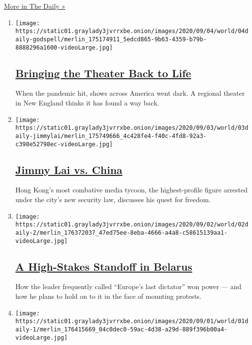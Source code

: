 \href{/column/the-daily}{More in The Daily »}

\begin{enumerate}
\def\labelenumi{\arabic{enumi}.}
\item
  \texttt{[image: https://static01.graylady3jvrrxbe.onion/images/2020/09/04/world/04daily-godspell/merlin\_175174911\_5edcd865-9b63-4359-b79b-8888296a1600-videoLarge.jpg]}

  \hypertarget{bringing-the-theater-back-to-life}{%
  \subsection{\texorpdfstring{\href{/2020/09/04/podcasts/the-daily/Godspell-theater-coronavirus.html}{Bringing
  the Theater Back to
  Life}}{Bringing the Theater Back to Life}}\label{bringing-the-theater-back-to-life}}

  When the pandemic hit, shows across America went dark. A regional
  theater in New England thinks it has found a way back.
\item
  \texttt{[image: https://static01.graylady3jvrrxbe.onion/images/2020/09/03/world/03daily-jimmylai/merlin\_175749666\_4c428fe4-f40c-4fd8-92a3-c398e52798ec-videoLarge.jpg]}

  \hypertarget{jimmy-lai-vs-china}{%
  \subsection{\texorpdfstring{\href{/2020/09/03/podcasts/the-daily/hong-kong-china-jimmy-lai.html}{Jimmy
  Lai vs. China}}{Jimmy Lai vs. China}}\label{jimmy-lai-vs-china}}

  Hong Kong's most combative media tycoon, the highest-profile figure
  arrested under the city's new security law, discusses his quest for
  freedom.
\item
  \texttt{[image: https://static01.graylady3jvrrxbe.onion/images/2020/09/02/world/02daily-2/merlin\_176372037\_47ed75ee-8eba-4666-a4a8-c58615139aa1-videoLarge.jpg]}

  \hypertarget{a-high-stakes-standoff-in-belarus}{%
  \subsection{\texorpdfstring{\href{/2020/09/02/podcasts/the-daily/belarus-protests-lukashenko.html}{A
  High-Stakes Standoff in
  Belarus}}{A High-Stakes Standoff in Belarus}}\label{a-high-stakes-standoff-in-belarus}}

  How the leader frequently called ``Europe's last dictator'' won power
  --- and how he plans to hold on to it in the face of mounting
  protests.
\item
  \texttt{[image: https://static01.graylady3jvrrxbe.onion/images/2020/09/01/world/01daily-1/merlin\_176415669\_04c0dec0-59ac-4d38-a29d-889f396b00a4-videoLarge.jpg]}


\end{enumerate}
